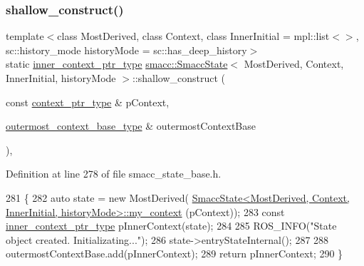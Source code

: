 \subsubsection{\texorpdfstring{shallow\+\_\+construct()}{shallow\_construct()}}
{\footnotesize\ttfamily template$<$class Most\+Derived, class Context, class Inner\+Initial = mpl\+::list$<$$>$, sc\+::history\+\_\+mode history\+Mode = sc\+::has\+\_\+deep\+\_\+history$>$ \\
static \hyperlink{classsmacc_1_1SmaccState_a65a772c2e2039e9a59148ba6ffb54d8a}{inner\+\_\+context\+\_\+ptr\+\_\+type} \hyperlink{classsmacc_1_1SmaccState}{smacc\+::\+Smacc\+State}$<$ Most\+Derived, Context, Inner\+Initial, history\+Mode $>$\+::shallow\+\_\+construct (\begin{DoxyParamCaption}\item[{const \hyperlink{classsmacc_1_1SmaccState_a0e15b77514301039f6bc093a9d3f6425}{context\+\_\+ptr\+\_\+type} \&}]{p\+Context,  }\item[{\hyperlink{classsmacc_1_1SmaccState_aaf76bbe2aa9dd73e3284605f84ab4b16}{outermost\+\_\+context\+\_\+base\+\_\+type} \&}]{outermost\+Context\+Base }\end{DoxyParamCaption})\hspace{0.3cm}{\ttfamily [inline]}, {\ttfamily [static]}}



Definition at line 278 of file smacc\+\_\+state\+\_\+base.\+h.


\begin{DoxyCode}
281   \{
282     \textcolor{keyword}{auto} state = \textcolor{keyword}{new} MostDerived(
      \hyperlink{classSmaccState}{SmaccState<MostDerived, Context, InnerInitial, historyMode>::my\_context}
      (pContext));
283     \textcolor{keyword}{const} \hyperlink{classsmacc_1_1SmaccState_a65a772c2e2039e9a59148ba6ffb54d8a}{inner\_context\_ptr\_type} pInnerContext(state);
284 
285     ROS\_INFO(\textcolor{stringliteral}{"State object created. Initializating..."});
286     state->entryStateInternal();
287 
288     outermostContextBase.add(pInnerContext);
289     \textcolor{keywordflow}{return} pInnerContext;
290   \}
\end{DoxyCode}
\mbox{\label{classsmacc_1_1SmaccState_a21ccc458f911ecc1e9a52287f7793ef8}} 
